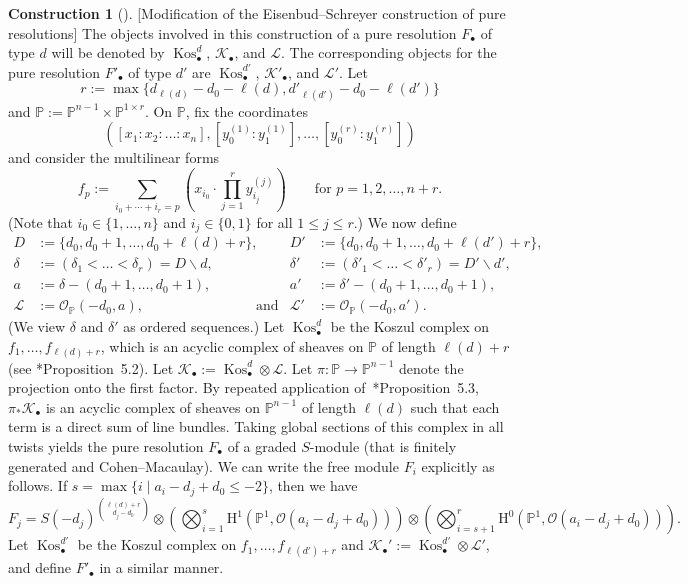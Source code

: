 \documentclass[12pt]{amsart}
\theoremstyle{definition}
\newtheorem{con}[equation]{Construction}
\newenvironment{construction}[1][]{\begin{con}[#1]\pushQED{\qed}}{\popQED \end{con}}
\newcommand{\Hs}{\mathrm{H}}
\newcommand{\KK}{\mathcal{K}}
\newcommand{\cL}{\mathcal{L}}
\newcommand{\cO}{{\mathcal O}}
\newcommand{\PP}{\mathbb{P}}
\DeclareMathOperator{\Kos}{Kos}
\newcommand{\minus}{\ensuremath{\!\smallsetminus\!}}
\begin{document}
\begin{construction}
[Modification of the Eisenbud--Schreyer construction of pure resolutions]
\label{modif:es}
The objects involved in this construction of a pure resolution $F_\bullet$
of type $d$ will be denoted by $\Kos^d_\bullet$, $\KK_\bullet$, and $\cL$.
The corresponding objects for the pure resolution $F'_\bullet$ of type $d'$
are $\Kos^{d'}_\bullet$, $\KK'_\bullet$, and $\cL'$. Let 
\begin{equation}
\label{equation:rForKos}
r :=\max\{d_{\ell(d)}-d_0-\ell(d), d'_{\ell(d')}-d_0-\ell(d')\}
\end{equation}
and $\PP := \PP^{n-1}\times \PP^{1\times r}$. On $\PP$, fix the coordinates 
\[
\left([x_1:x_2:\dots:x_n], [y^{(1)}_0:y^{(1)}_1], \ldots,
[y^{(r)}_0:y^{(r)}_1]\right) 
\] 
and consider the multilinear forms 
\[
f_p := \sum_{i_0 + \cdots + i_r = p} 
\left(	x_{i_0}\cdot \prod_{j=1}^r y_{i_j}^{(j)} \right)
	\qquad \text{for } p = 1,2,\dots,n+r.
\]
(Note that $i_0 \in \{1, \ldots, n\}$ and $i_j \in \{0,1\}$ for all $1 \leq
j \leq r$.) We now define 
\begin{align*}
D & := \{d_0, d_0+1, \dots, d_0+\ell(d)+r\}, &
D' & := \{d_0, d_0+1, \dots, d_0+\ell(d')+r\}, \\
\delta & := (\delta_1< \dots< \delta_r) = D \minus d, &
\delta' & := (\delta'_1< \dots< \delta'_r) = D' \minus d', \\
a & := \delta - (d_0+1, \ldots, d_0+1), & 
a' & := \delta' - (d_0+1, \ldots, d_0+1),& \\
\cL & := \cO_\PP(-d_0,a), \qquad \qquad \qquad \qquad \text{and} & 
\cL' & := \cO_\PP(-d_0,a').
\end{align*}
(We view $\delta$ and $\delta'$ as ordered sequences.) 
Let $\Kos^{d}_\bullet$ be the Koszul complex on
$f_1, \dots, f_{\ell(d)+r}$, which is an acyclic complex of sheaves on
$\PP$ of length $\ell(d)+r$ (see
\cite{EiScConjOfBS07}*{Proposition~5.2}).  Let $\KK_\bullet
:= \Kos^d_\bullet \otimes \cL$.  Let $\pi\colon\PP \rightarrow
\PP^{n-1}$ denote the projection onto the first factor. By repeated
application of~\cite{EiScConjOfBS07}*{Proposition~5.3}, 
$\pi_*\KK_\bullet$ is an acyclic complex of sheaves on $\PP^{n-1}$ of
length $\ell(d)$ such that each term is a direct sum of line
bundles. Taking global sections of this complex in all twists yields
the pure resolution $F_\bullet$ of a graded $S$-module (that is
finitely generated and Cohen--Macaulay).  We
can write the free module $F_i$ explicitly as follows.  If $s=\max\{i \mid a_i-d_j+d_0 \leq -2\}$,
then we have
\[
F_j  = S(-d_j)^{\binom{\ell(d)+r}{d_j-d_0}}\otimes \left(
    \bigotimes_{i=1}^s \Hs^1(\PP^1, \cO(a_i-d_j+d_0)) \right) \otimes
  \left( \bigotimes_{i=s+1}^r \Hs^0(\PP^1, \cO(a_i-d_j+d_0)) \right) .
\]
Let $\Kos^{d'}_\bullet$ be the Koszul complex on 
$f_1, \dots, f_{\ell(d')+r}$ and $\KK_\bullet' := \Kos^{d'}_\bullet \otimes \cL'$, 
and define $F'_\bullet$ in a similar manner.
\end{construction}
\end{document}
